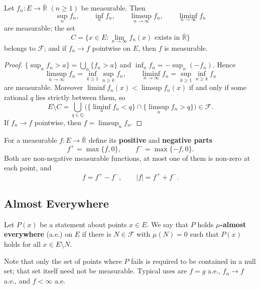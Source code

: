 \documentclass[11pt]{article}
\makeatletter
\newcommand{\envlabel}[1]{\protected@edef\@currentlabel{\themathenv}\label{#1}}
\makeatother
\begin{document}
\begin{proposition}\envlabel{en:prop:limits}
Let $f_{n}:E\to\overline{\mathbb{R}}$ $(n\geq1)$ be measurable. Then
\[
\sup_{n}f_{n},\qquad\inf_{n}f_{n},\qquad\limsup_{n\to\infty}f_{n},\qquad\liminf_{n\to\infty}f_{n}
\]
are measurable; the set
\[
C=\Big\{x\in E:\lim_{n\to\infty}f_{n}(x)\text{ exists in }\overline{\mathbb{R}}\Big\}
\]
belongs to $\mathcal{F}$; and if $f_{n}\to f$ pointwise on $E$, then $f$ is measurable.
\end{proposition}

\begin{proof}
$\{\sup_{n}f_{n}>a\}=\bigcup_{n}\{f_{n}>a\}$ and $\inf_{n}f_{n}=-\sup_{n}(-f_{n})$. Hence
\[
\limsup_{n\to\infty}f_{n}=\inf_{k\geq1}\sup_{n\geq k}f_{n},\qquad \liminf_{n\to\infty}f_{n}=\sup_{k\geq1}\inf_{n\geq k}f_{n}
\]
are measurable. Moreover $\liminf f_{n}(x)<\limsup f_{n}(x)$ if and only if some rational $q$ lies strictly between them, so
\[
E\setminus C=\bigcup_{q\in\mathbb{Q}}\Big(\big\{\liminf_{n}f_{n}<q\big\}\cap\big\{\limsup_{n}f_{n}>q\big\}\Big)\in\mathcal{F}.
\]
If $f_{n}\to f$ pointwise, then $f=\limsup_{n}f_{n}$.
\end{proof}

For a measurable $f:E\to\overline{\mathbb{R}}$ define its \textbf{positive} and \textbf{negative parts}
\[
f^{+}=\max\{f,0\},\qquad f^{-}=\max\{-f,0\}.
\]
Both are non-negative measurable functions, at most one of them is non-zero at each point, and
\[
f=f^{+}-f^{-},\qquad |f|=f^{+}+f^{-}.
\]

\subsection{Almost Everywhere}

\begin{definition}
Let $P(x)$ be a statement about points $x\in E$. We say that $P$ holds \textbf{$\mu$-almost everywhere} (a.e.) on $E$ if there is $N\in\mathcal{F}$ with $\mu(N)=0$ such that $P(x)$ holds for all $x\in E\setminus N$.
\end{definition}

Note that only the set of points where $P$ fails is required to be contained in a null set; that set itself need not be measurable. Typical uses are $f=g$ a.e., $f_{n}\to f$ a.e., and $f<\infty$ a.e.
\end{document}
